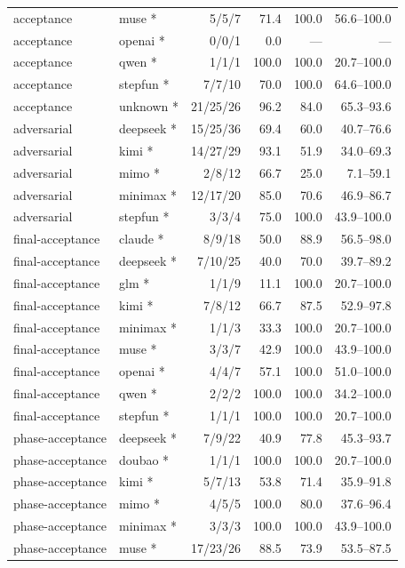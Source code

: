 \documentclass[
  10pt,
  a4paper,
]{article}
\begin{document}
\begin{longtable}[]{@{}llrrrr@{}}
acceptance & muse * & 5/5/7 & 71.4 & 100.0 & 56.6--100.0 \\
acceptance & openai * & 0/0/1 & 0.0 & --- & --- \\
acceptance & qwen * & 1/1/1 & 100.0 & 100.0 & 20.7--100.0 \\
acceptance & stepfun * & 7/7/10 & 70.0 & 100.0 & 64.6--100.0 \\
acceptance & unknown * & 21/25/26 & 96.2 & 84.0 & 65.3--93.6 \\
adversarial & deepseek * & 15/25/36 & 69.4 & 60.0 & 40.7--76.6 \\
adversarial & kimi * & 14/27/29 & 93.1 & 51.9 & 34.0--69.3 \\
adversarial & mimo * & 2/8/12 & 66.7 & 25.0 & 7.1--59.1 \\
adversarial & minimax * & 12/17/20 & 85.0 & 70.6 & 46.9--86.7 \\
adversarial & stepfun * & 3/3/4 & 75.0 & 100.0 & 43.9--100.0 \\
final-acceptance & claude * & 8/9/18 & 50.0 & 88.9 & 56.5--98.0 \\
final-acceptance & deepseek * & 7/10/25 & 40.0 & 70.0 & 39.7--89.2 \\
final-acceptance & glm * & 1/1/9 & 11.1 & 100.0 & 20.7--100.0 \\
final-acceptance & kimi * & 7/8/12 & 66.7 & 87.5 & 52.9--97.8 \\
final-acceptance & minimax * & 1/1/3 & 33.3 & 100.0 & 20.7--100.0 \\
final-acceptance & muse * & 3/3/7 & 42.9 & 100.0 & 43.9--100.0 \\
final-acceptance & openai * & 4/4/7 & 57.1 & 100.0 & 51.0--100.0 \\
final-acceptance & qwen * & 2/2/2 & 100.0 & 100.0 & 34.2--100.0 \\
final-acceptance & stepfun * & 1/1/1 & 100.0 & 100.0 & 20.7--100.0 \\
phase-acceptance & deepseek * & 7/9/22 & 40.9 & 77.8 & 45.3--93.7 \\
phase-acceptance & doubao * & 1/1/1 & 100.0 & 100.0 & 20.7--100.0 \\
phase-acceptance & kimi * & 5/7/13 & 53.8 & 71.4 & 35.9--91.8 \\
phase-acceptance & mimo * & 4/5/5 & 100.0 & 80.0 & 37.6--96.4 \\
phase-acceptance & minimax * & 3/3/3 & 100.0 & 100.0 & 43.9--100.0 \\
phase-acceptance & muse * & 17/23/26 & 88.5 & 73.9 & 53.5--87.5 \\

\end{longtable}
\end{document}
